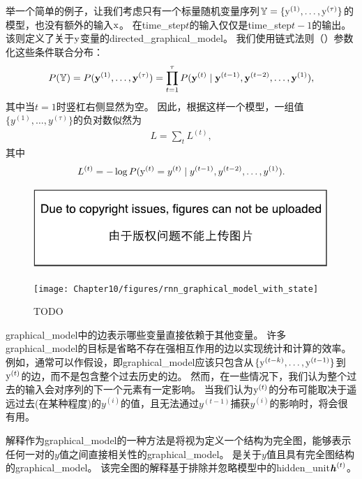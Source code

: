 举一个简单的例子，让我们考虑只有一个标量随机变量序列$ \mathbb{Y} = \{\mathrm{y}^{(1)},\dots,\mathrm{y}^{(\tau)}\}$的模型，也没有额外的输入$\mathrm{x}$。
在\gls{time_step}$t$的输入仅仅是\gls{time_step}$t-1$的输出。
该则定义了关于$\mathrm{y}$变量的\gls{directed_graphical_model}。
我们使用链式法则（）参数化这些条件联合分布：
\begin{align}
 P(\mathbb{Y}) = P(\mathbf{y}^{(1)},\dots,\mathbf{y}^{(\tau)}) = \prod_{t=1}^{\tau}P(\mathbf{y}^{(t)} \mid \mathbf{y}^{(t-1)},\mathbf{y}^{(t-2)},
 \dots,\mathbf{y}^{(1)}),
\end{align}
其中当$t=1$时竖杠右侧显然为空。
因此，根据这样一个模型，一组值$\{y^{(1)},\dots,y^{(\tau)} \}$的负对数似然为
\begin{align}
 L = \sum_{t} L^{(t)},
\end{align}
其中
\begin{align}
 L^{(t)} = -\log P(\mathrm{y}^{(t)} = y^{(t)} \mid y^{(t-1)},y^{(t-2)}, \dots, y^{(1)}).
\end{align}
\begin{figure}[!htb]
\ifOpenSource
\centerline{\includegraphics{figure.pdf}}
\else
\centerline{\texttt{[image: Chapter10/figures/rnn\_graphical\_model\_with\_state]}}
\fi
\caption{TODO}
\label{fig:chap10_rnn_graphical_model_with_state}
\end{figure}

\gls{graphical_model}中的边表示哪些变量直接依赖于其他变量。
许多\gls{graphical_model}的目标是省略不存在强相互作用的边以实现统计和计算的效率。
例如，通常可以作假设，即\gls{graphical_model}应该只包含从$\{ \mathrm{y}^{(t-k)}, \dots, \mathrm{y}^{(t-1)}\}$到$\mathrm{y}^{(t)}$的边，而不是包含整个过去历史的边。
然而，在一些情况下，我们认为整个过去的输入会对序列的下一个元素有一定影响。
当我们认为$\mathrm{y}^{(t)}$的分布可能取决于遥远过去(在某种程度)的$y^{(i)}$的值，且无法通过$y^{(t-1)}$捕获$y^{(i)}$的影响时，将会很有用。

解释作为\gls{graphical_model}的一种方法是将视为定义一个结构为完全图，能够表示任何一对的$y$值之间直接相关性的\gls{graphical_model}。
是关于$y$值且具有完全图结构的\gls{graphical_model}。
该完全图的解释基于排除并忽略模型中的\gls{hidden_unit}$\boldsymbol{\mathit{h}}^{(t)}$。

